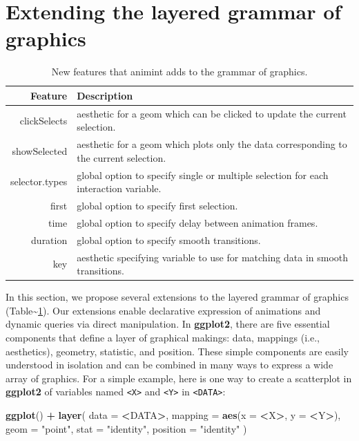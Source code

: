 \documentclass[12pt,]{article}
\newenvironment{Shaded}{\begin{snugshade}}{\end{snugshade}}
\newcommand{\DataTypeTok}[1]{\textcolor[rgb]{0.13,0.29,0.53}{#1}}
\newcommand{\KeywordTok}[1]{\textcolor[rgb]{0.13,0.29,0.53}{\textbf{#1}}}
\newcommand{\NormalTok}[1]{#1}
\newcommand{\OperatorTok}[1]{\textcolor[rgb]{0.81,0.36,0.00}{\textbf{#1}}}
\newcommand{\StringTok}[1]{\textcolor[rgb]{0.31,0.60,0.02}{#1}}
\theoremstyle{definition}
\theoremstyle{definition}
\theoremstyle{definition}
\theoremstyle{remark}
\begin{document}
\hypertarget{extending-the-layered-grammar-of-graphics}{%
\section{Extending the layered grammar of
graphics}\label{extending-the-layered-grammar-of-graphics}}

\begin{table}

\caption{
New features that animint adds to the grammar of graphics.
}\label{tab:overview}
\small
\begin{tabularx}{\textwidth}{rl}
Feature & Description \\
\hline
clickSelects & aesthetic for a geom which can be clicked to update the current selection.  \\
showSelected & aesthetic for a geom which plots only the data corresponding to the current selection.  \\
selector.types & global option to specify single or multiple selection for each interaction variable.  \\
first & global option to specify first selection.  \\
time & global option to specify delay between animation frames.  \\
duration & global option to specify smooth transitions.  \\
key & aesthetic specifying variable to use for matching data in smooth transitions. \\
\hline
\end{tabularx}

\end{table}

In this section, we propose several extensions to the layered grammar of
graphics (Table\textasciitilde{}\ref{tab:overview}). Our extensions
enable declarative expression of animations and dynamic queries via
direct manipulation. In \textbf{ggplot2}, there are five essential
components that define a layer of graphical makings: data, mappings
(i.e., aesthetics), geometry, statistic, and position. These simple
components are easily understood in isolation and can be combined in
many ways to express a wide array of graphics. For a simple example,
here is one way to create a scatterplot in \textbf{ggplot2} of variables
named \texttt{\textless{}X\textgreater{}} and
\texttt{\textless{}Y\textgreater{}} in
\texttt{\textless{}DATA\textgreater{}}:

\begin{Shaded}
\begin{Highlighting}[]
\KeywordTok{ggplot}\NormalTok{() }\OperatorTok{+}\StringTok{ }\KeywordTok{layer}\NormalTok{(}
  \DataTypeTok{data =} \OperatorTok{<}\NormalTok{DATA}\OperatorTok{>}\NormalTok{, }
  \DataTypeTok{mapping =} \KeywordTok{aes}\NormalTok{(}\DataTypeTok{x =} \OperatorTok{<}\NormalTok{X}\OperatorTok{>}\NormalTok{, }\DataTypeTok{y =} \OperatorTok{<}\NormalTok{Y}\OperatorTok{>}\NormalTok{), }
  \DataTypeTok{geom =} \StringTok{"point"}\NormalTok{, }
  \DataTypeTok{stat =} \StringTok{"identity"}\NormalTok{,}
  \DataTypeTok{position =} \StringTok{"identity"}
\NormalTok{)}
\end{Highlighting}
\end{Shaded}
\end{document}
